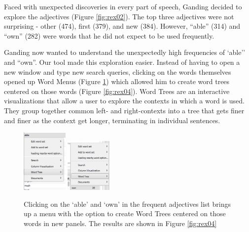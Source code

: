 \documentclass{sig-alternate}
\begin{document}
Faced with unexpected discoveries in every part of speech, Ganding decided to explore the adjectives (Figure \ref{fig:rex02}). The top three adjectives were not surprising - other (474), first (379), and new (384).  However,  ``able'' (314) and ``own'' (282) were words that he did not expect to be used frequently.

Ganding now wanted to understand the unexpectedly high frequencies of `able'' and ``own''. Our tool made this exploration easier. Instead of having to open a new window and type new search queries, clicking on the words themselves opened up Word Menus (Figure \ref{fig:rex03}) which allowed him to create word trees centered on those words (Figure \ref{fig:rex04}).  Word Trees \cite{wattenberg_word_2008} are an interactive visualizations that allow a user to explore the contexts in which a word is used. They group together common left- and right-contexts into a tree that gets finer and finer as the context get longer, terminating in individual sentences.  
\begin{figure}[h!]
\includegraphics[width=0.2\textwidth]{fig/rex/03.png}
\includegraphics[width=0.2\textwidth]{fig/rex/03b.png}
\caption{Clicking on the `able' and `own' in the frequent adjectives list brings up a menu with the option to create Word Trees centered on those words in new panels. The results are shown in Figure \ref{fig:rex04} \label{fig:rex03}}
\end{figure}
\end{document}
